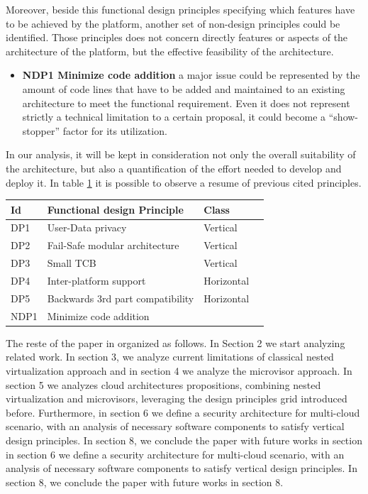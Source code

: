 \documentclass{acm_proc_article-sp} %
\begin{document}
Moreover, beside this functional design principles specifying which features have to be achieved by the platform, another set of non-design principles could be identified. Those principles does not concern directly features or aspects of the architecture of the platform, but the effective feasibility of the architecture. 
\begin{itemize}[]
\item \textbf{NDP1 Minimize code addition} a major issue could be represented by the amount of code lines that have to be added and maintained to an existing architecture to meet the functional requirement. Even it does not represent strictly a technical limitation to a certain proposal, it could become a ``show-stopper'' factor for its utilization.
\end{itemize}
In our analysis, it will be kept in consideration not only the overall suitability of the architecture, but also a quantification of the effort needed to develop and deploy it. In table \ref{int:des} it is possible to observe a resume of previous cited principles.
 
\begin{table}
\label{int:des}
\begin{tabular}{llll}
\toprule
Id & Functional design Principle & Class &\\
\midrule
   DP1 & User-Data privacy & Vertical & \\
   DP2 & Fail-Safe modular architecture & Vertical & \\ 
   DP3 & Small TCB & Vertical & \\
   DP4 & Inter-platform support & Horizontal & \\
   DP5 & Backwards 3rd part compatibility & Horizontal \\
   NDP1 & Minimize code addition & & \\
\bottomrule
      \end{tabular}
\end{table}

The reste of the paper in organized as follows. In Section 2 we start analyzing related work. In section 3, we analyze current limitations of classical nested virtualization approach and in section 4 we analyze the microvisor approach. In section 5 we analyzes cloud architectures propositions, combining nested virtualization and microvisors, leveraging the design principles grid introduced before. Furthermore, in section 6 we define a security architecture for multi-cloud scenario, with an analysis of necessary software components to satisfy vertical design principles. In section 8, we conclude the paper with future works in section  in section 6 we define a security architecture for multi-cloud scenario, with an analysis of necessary software components to satisfy vertical design principles. In section 8, we conclude the paper with future works in section 8. 
 
\end{document}
